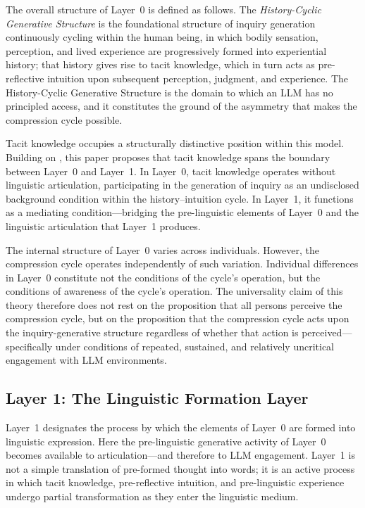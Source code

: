 \documentclass[12pt]{article}
\begin{document}
The overall structure of Layer~0 is defined as follows. The \emph{History-Cyclic Generative Structure} is the foundational structure of inquiry generation continuously cycling within the human being, in which bodily sensation, perception, and lived experience are progressively formed into experiential history; that history gives rise to tacit knowledge, which in turn acts as pre-reflective intuition upon subsequent perception, judgment, and experience. The History-Cyclic Generative Structure is the domain to which an LLM has no principled access, and it constitutes the ground of the asymmetry that makes the compression cycle possible.

Tacit knowledge occupies a structurally distinctive position within this model. Building on \citet{polanyi1966}, this paper proposes that tacit knowledge spans the boundary between Layer~0 and Layer~1. In Layer~0, tacit knowledge operates without linguistic articulation, participating in the generation of inquiry as an undisclosed background condition within the history--intuition cycle. In Layer~1, it functions as a mediating condition---bridging the pre-linguistic elements of Layer~0 and the linguistic articulation that Layer~1 produces.

The internal structure of Layer~0 varies across individuals. However, the compression cycle operates independently of such variation. Individual differences in Layer~0 constitute not the conditions of the cycle's operation, but the conditions of awareness of the cycle's operation. The universality claim of this theory therefore does not rest on the proposition that all persons perceive the compression cycle, but on the proposition that the compression cycle acts upon the inquiry-generative structure regardless of whether that action is perceived---specifically under conditions of repeated, sustained, and relatively uncritical engagement with LLM environments.

\subsection{Layer 1: The Linguistic Formation Layer}

Layer~1 designates the process by which the elements of Layer~0 are formed into linguistic expression. Here the pre-linguistic generative activity of Layer~0 becomes available to articulation---and therefore to LLM engagement. Layer~1 is not a simple translation of pre-formed thought into words; it is an active process in which tacit knowledge, pre-reflective intuition, and pre-linguistic experience undergo partial transformation as they enter the linguistic medium.
\end{document}
